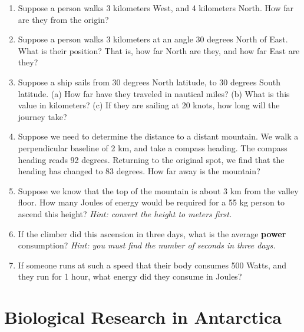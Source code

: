 \documentclass[10pt]{article}
\begin{document}
\begin{enumerate}
\item Suppose a person walks 3 kilometers West, and 4 kilometers North.  How far are they from the origin? \\ \vspace{1cm}
\item Suppose a person walks 3 kilometers at an angle 30 degrees North of East.  What is their position?  That is, how far North are they, and how far East are they? \\ \vspace{1cm}
\item Suppose a ship sails from 30 degrees North latitude, to 30 degrees South latitude. (a)  How far have they traveled in nautical miles?  (b) What is this value in kilometers? (c) If they are sailing at 20 knots, how long will the journey take?  \\ \vspace{1.5cm}
\item Suppose we need to determine the distance to a distant mountain.  We walk a perpendicular baseline of 2 km, and take a compass heading.  The compass heading reads 92 degrees.  Returning to the original spot, we find that the heading has changed to 83 degrees.  How far away is the mountain?  \\ \vspace{1.5cm}
\item Suppose we know that the top of the mountain is about 3 km from the valley floor.  How many Joules of energy would be required for a 55 kg person to ascend this height?  \textit{Hint: convert the height to meters first.}  \\ \vspace{1cm}
\item If the climber did this ascension in three days, what is the average \textbf{power} consumption? \textit{Hint: you must find the number of seconds in three days.} \\ \vspace{1.5cm}
\item If someone runs at such a speed that their body consumes 500 Watts, and they run for 1 hour, what energy did they consume in Joules? \\ \vspace{2cm}
\end{enumerate}

\section{Biological Research in Antarctica}
\end{document}
